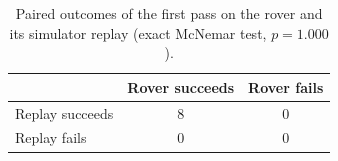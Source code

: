 \begin{table}[htbp]
\centering
\caption{Paired outcomes of the first pass on the rover and its simulator replay (exact McNemar test, $p = 1.000$).}
\label{tab:rdt_mcnemar}
\small
\begin{tabular}{lcc}
\toprule
 & Rover succeeds & Rover fails \\
\midrule
Replay succeeds & 8 & 0 \\
Replay fails & 0 & 0 \\
\bottomrule
\end{tabular}
\end{table}
